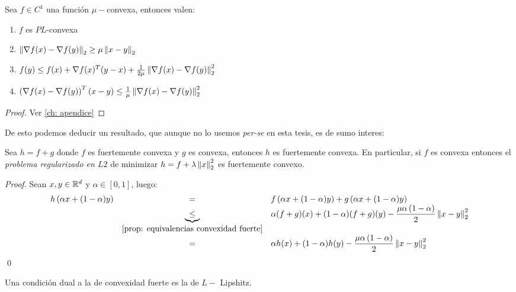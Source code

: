 \begin{proposition}
	\label{prop: implicancias de convexidad fuerte}
	Sea $f \in C^1$ una funci\'on $\mu-$convexa, entonces valen:
	\begin{enumerate}
		\item $f$ es $PL$-convexa
		\item $\left\lVert\nabla f(x) - \nabla f(y)\right\rVert_2 \geq \mu \left\lVert x-y\right\rVert_2$
		\item $f(y) \leq f(x) + \nabla f(x)^T (y-x) + \frac{1}{2 \mu} \left\lVert\nabla f(x) - \nabla f(y)\right\rVert_2^2$
		\item $ \left(\nabla f(x) - \nabla f(y)\right)^T (x-y) \leq \frac{1}{\mu} \left\lVert\nabla f(x) - \nabla f(y)\right\rVert_2^2$
	\end{enumerate}
\end{proposition}

\begin{proof}
	Ver \ref{ch: apendice}
\end{proof}

De esto podemos deducir un resultado, que aunque no lo usemos \textit{per-se} en esta tesis, es de sumo interes:

\begin{corollary}
	Sea $h = f+g$ donde $f$ es fuertemente convexa y $g$ es convexa, entonces $h$ es fuertemente convexa. En particular, si $f$ es convexa entonces el \textit{problema regularizado en $L2$} de minimizar $h = f + \lambda \left\lVert x\right\rVert_2^2$ es fuertemente convexo.
\end{corollary}

\begin{proof}
	Sean $x,y \in {\mathbb{R}}^d$ y $\alpha \in [0,1]$, luego:
	\begin{equation*}
	\begin{array}{rcl}
	h\left(\alpha x + (1-\alpha)y\right) & = & f\left(\alpha x + (1-\alpha)y\right)  + g\left(\alpha x + (1-\alpha)y\right)  \\
	& \underbrace{\leq}_{\ref{prop: equivalencias convexidad fuerte}} & \alpha(f + g)(x) + (1-\alpha)(f+g)(y) - \dfrac{\mu \alpha \left(1-\alpha\right)}{2} \left\lVert x-y\right\rVert^2_2 \\
	& = & \alpha h(x) + (1-\alpha)h(y) - \dfrac{\mu \alpha \left(1-\alpha\right)}{2} \left\lVert x-y\right\rVert^2_2 
	\end{array}
	\end{equation*}\qed
\end{proof}

Una condici\'on dual a la de convexidad fuerte es la de $L-$ Lipshitz.

